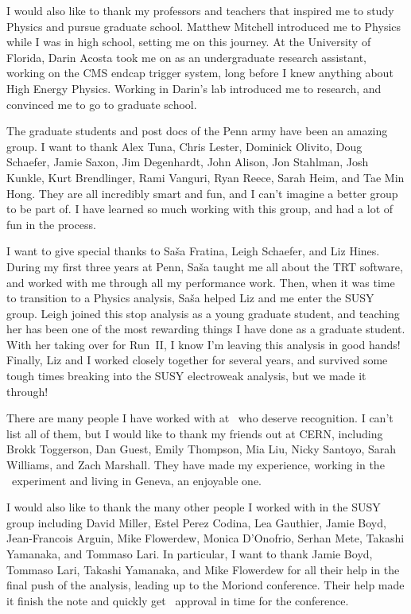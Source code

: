 I would also like to thank my professors and teachers that inspired me to
study Physics and pursue graduate school.
Matthew Mitchell introduced me to Physics while I was in high school, setting
me on this journey.
At the University of Florida, Darin Acosta took me on as an undergraduate
research assistant, working on the CMS endcap trigger system, long before
I knew anything about High Energy Physics.
Working in Darin's lab introduced me to research, and convinced me to go to
graduate school.

The graduate students and post docs of the Penn army have been an amazing
group.
I want to thank
Alex Tuna,
Chris Lester,
Dominick Olivito,
Doug Schaefer,
Jamie Saxon,
Jim Degenhardt,
John Alison,
Jon Stahlman,
Josh Kunkle,
Kurt Brendlinger,
Rami Vanguri,
Ryan Reece,
Sarah Heim,
and Tae Min Hong.
They are all incredibly smart and fun, and I can't imagine a better group to be
part of.
I have learned so much working with this group, and had a lot of fun in the
process.

I want to give special thanks to Sa\v{s}a Fratina, Leigh Schaefer, and Liz
Hines.
During my first three years at Penn, Sa\v{s}a taught me all about the TRT
software, and worked with me through all my performance work.
Then, when it was time to transition to a Physics analysis, Sa\v{s}a helped Liz
and me enter the SUSY group.
Leigh joined this stop analysis as a young graduate student, and teaching her
has been one of the most rewarding things I have done as a graduate student.
With her taking over for Run~II, I know I'm leaving this analysis in good
hands!
Finally, Liz and I worked closely together for several years, and survived some
tough times breaking into the SUSY electroweak analysis, but we made it
through!

There are many people I have worked with at \atlas\ who deserve recognition.
I can't list all of them, but I would like to thank my friends out at CERN,
including
Brokk Toggerson,
Dan Guest,
Emily Thompson,
Mia Liu,
Nicky Santoyo,
Sarah Williams,
and Zach Marshall.
They have made my experience, working in the \atlas\ experiment and living in
Geneva, an enjoyable one.

I would also like to thank the many other people I worked with in the SUSY
group including
David Miller,
Estel Perez Codina,
Lea Gauthier,
Jamie Boyd,
Jean-Francois Arguin,
Mike Flowerdew,
Monica D'Onofrio,
Serhan Mete,
Takashi Yamanaka,
and Tommaso Lari.
In particular, I want to thank Jamie Boyd, Tommaso Lari, Takashi Yamanaka, and
Mike Flowerdew for all their help in the final push of the analysis, leading up
to the Moriond conference.
Their help made it finish the note and quickly get \atlas\ approval in time
for the conference.


